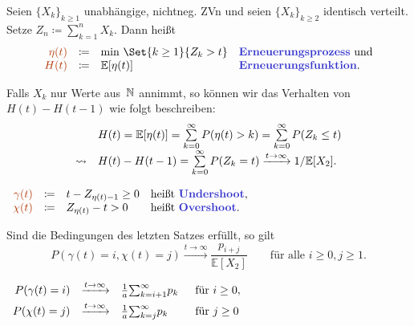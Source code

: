 \documentclass{cheat-sheet}
\newcommand{\E}{\mathbb{E}} %
\newcommand{\Defn}[1]{\textcolor{DefinitionColor}{#1}}
\begin{document}
\begin{defn}
  Seien $\{ X_k \}_{k \geq 1}$ unabhängige, nichtneg. ZVn und seien $\{ X_k \}_{k \geq 2}$ identisch verteilt.
  Setze $Z_n \coloneqq {\sum}_{k=1}^n X_k$.
  Dann heißt
  \[
    \begin{array}{r c l l}
      \Defn{\eta(t)} &\coloneqq& \min\,\Set{k \geq 1}{Z_k > t} &
      \text{\emph{Erneuerungsprozess} und} \\
      \Defn{H(t)} &\coloneqq& \E[\eta(t)]
      & \text{\emph{Erneuerungsfunktion}.}
    \end{array}
  \]
\end{defn}

Falls $X_k$ nur Werte aus~$\mathbb{N}$ annimmt, so können wir das Verhalten von $H(t) - H(t-1)$ wie folgt beschreiben:
\[\begin{array}{r l}
  & H(t) = \E[\eta(t)] = \sum_{k=0}^\infty P(\eta(t) > k) = \sum_{k=0}^\infty P(Z_k \leq t) \\
  \rightsquigarrow & H(t) - H(t-1) = \sum_{k=0}^\infty P(Z_k = t) \xrightarrow{t \to \infty} 1/\E[X_2].
\end{array}\]

\begin{defn}
  $
    \begin{array}[t]{r c l l}
    \Defn{\gamma(t)} &\coloneqq& t - Z_{\eta(t)-1} \geq 0 & \text{heißt \emph{Undershoot},} \\
    \Defn{\chi(t)} &\coloneqq& Z_{\eta(t)} - t > 0 & \text{heißt \emph{Overshoot}.}
    \end{array}
  $
\end{defn}

\begin{satz}
  Sind die Bedingungen des letzten Satzes erfüllt, so gilt
  \[
    P(\gamma(t)=i, \chi(t)=j) \xrightarrow{t \to \infty} \frac{p_{i+j}}{\E[X_2]}
    \qquad \text{für alle } i \geq 0, j \geq 1.
  \]
\end{satz}

\begin{kor}
  $
    \begin{array}[t]{r c l l}
      P(\gamma(t) = i) &\xrightarrow{t \to \infty}& \tfrac{1}{a} {\sum}_{k=i+1}^\infty p_k & \enspace \text{für $i \geq 0$}, \\[0.15cm]
      P(\chi(t) = j) &\xrightarrow{t \to \infty}& \tfrac{1}{a} {\sum}_{k=j}^\infty p_k & \enspace \text{für $j \geq 0$}
    \end{array}
  $
\end{kor}
\end{document}
